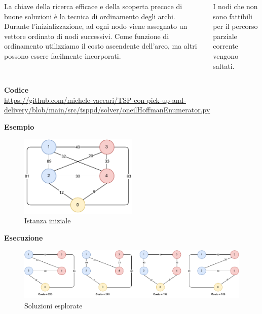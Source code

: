 \documentclass[9pt]{beamer}
\begin{document}
\begin{frame}{\subsecname}
\begin{columns}[T,onlytextwidth]
{		La chiave della ricerca efficace e della scoperta precoce di buone soluzioni è la tecnica di ordinamento degli archi. Durante l'inizializzazione, ad ogni nodo viene assegnato un vettore ordinato di nodi successivi. Come funzione di ordinamento utilizziamo il costo ascendente dell'arco, ma altri possono essere facilmente incorporati.

		I nodi che non sono fattibili per il percorso parziale corrente vengono saltati.

		}
	
	  \end{columns}

\framebreak

	\textbf{Codice} \\
	\href{https://github.com/michele-vaccari/TSP-con-pick-up-and-delivery/blob/main/src/tsppd/solver/oneilHoffmanEnumerator.py}{https://github.com/michele-vaccari/TSP-con-pick-up-and-delivery/blob/main/src/tsppd/solver/oneilHoffmanEnumerator.py}

	\textbf{Esempio}
	\begin{figure}[h]
	\centering
	\includegraphics[width=0.5\textwidth]
	{../images/graph-tsppd-with-two-customers}	
	\caption{Istanza iniziale}
	\end{figure}

	\textbf{Esecuzione}
      	\begin{figure}[h]
	\centering
	\includegraphics[width=\textwidth]
	{../images/graph-oneil-hoffman-solutions-tsppd-with-two-customers}	
	\caption{Soluzioni esplorate}
	\end{figure}

\framebreak


\end{frame}
\end{document}

